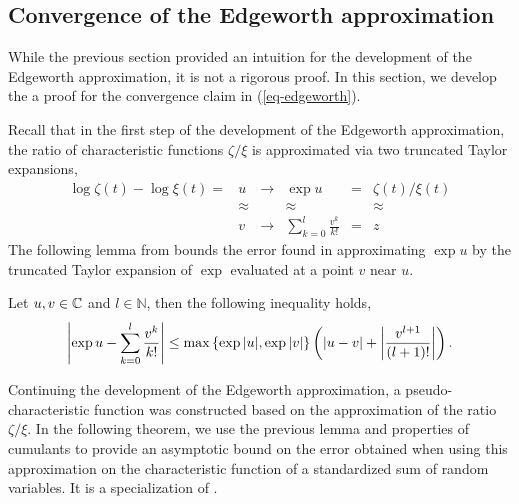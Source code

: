 \subsection{Convergence of the Edgeworth approximation}

While the previous section provided an intuition for the development of the Edgeworth approximation, it is not a rigorous proof. In this section, we develop the a proof for the convergence claim in (\ref{eq-edgeworth}).

Recall that in the first step of the development of the Edgeworth approximation, the ratio of characteristic functions $\zeta / \xi$ is approximated via two truncated Taylor expansions,
\begin{equation*}
    \begin{matrix}
        \log \zeta(t) - \log \xi(t) = & u & \longrightarrow & \exp u & = & \zeta(t) / \xi(t)\\
        &\approx & & \approx & & \approx \\
        &v  & \longrightarrow & \sum_{k=0}^l \frac{v^k}{k!} & = & z
    \end{matrix}
\end{equation*}
The following lemma from \cite[Theorem 2.5.3]{kolassa2006series} bounds the error found in approximating $\exp u$ by the truncated Taylor expansion of $\exp$ evaluated at a point $v$ near $u$.
\begin{lemma} \label{lemma-series}
    Let $u, v \in \mathbb{C}$ and $l \in \mathbb{N}$, then the following inequality holds,
    \begin{equation}
        \left|\exp{u} - \sum_{k=0}^l \frac{v^k}{k!}\right| \leq \max \left\{ \exp{|u|}, \exp{|v|} \right\}\left(\left|u - v\right| + \left|\frac{v^{l+1}}{(l+1)!}\right|\right).
    \end{equation}
\end{lemma}


Continuing the development of the Edgeworth approximation, a pseudo-characteristic function was constructed based on the approximation of the ratio $\zeta / \xi$. In the following theorem, we use the previous lemma and properties of cumulants to provide an asymptotic bound on the error obtained when using this approximation on the characteristic function of a standardized sum of random variables. It is a specialization of \cite[Corollary 2.5.4]{kolassa2006series}.

